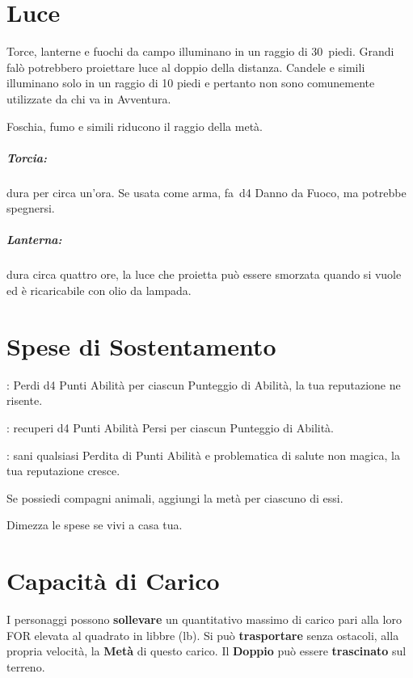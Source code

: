 \documentclass[itdr]{subfiles}
\begin{document}
\vfill

\section{Luce}

Torce, lanterne e fuochi da campo illuminano in un raggio di \mbox{30 piedi}. Grandi falò potrebbero proiettare luce al doppio della distanza. Candele e simili illuminano solo in un raggio di 10 piedi e pertanto non sono comunemente utilizzate da chi va in Avventura.

Foschia, fumo e simili riducono il raggio della metà.

\subparagraph{Torcia:} dura per circa un'ora. Se usata come arma, fa~d4 Danno da Fuoco, ma potrebbe spegnersi.

\subparagraph{Lanterna:} dura circa quattro ore, la luce che proietta può essere smorzata quando si vuole ed è ricaricabile con olio da lampada.

\vfill

\section{Spese di Sostentamento}

:
Perdi d4 Punti Abilità per ciascun Punteggio di Abilità, la tua reputazione ne risente.

:
recuperi d4 Punti Abilità Persi per ciascun Punteggio di Abilità.

:
sani qualsiasi Perdita di Punti Abilità e problematica di salute non magica, la tua reputazione cresce.

Se possiedi compagni animali, aggiungi la metà per ciascuno di essi.

Dimezza le spese se vivi a casa tua.

\vfill

\section{Capacità di Carico}

I personaggi possono \textbf{sollevare} un quantitativo massimo di carico pari alla loro FOR elevata al quadrato in libbre (lb). Si può \textbf{trasportare} senza ostacoli, alla propria velocità, la \textbf{Metà} di questo carico. Il \textbf{Doppio} può essere \textbf{trascinato} sul terreno.
\end{document}
